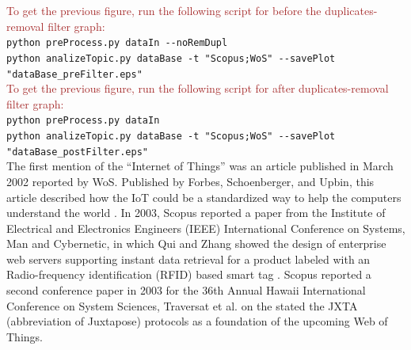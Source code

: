\documentclass[symmetry,article,accept,moreauthors,pdftex10pt,a4paper]{mdpi}
\begin{document}
\noindent
\textcolor{brown}{To get the previous figure, run the following script for before the duplicates-removal filter graph:}\\
\hspace*{0.5cm}\verb|python preProcess.py dataIn --noRemDupl|\\
\hspace*{0.5cm}\verb|python analizeTopic.py dataBase -t "Scopus;WoS" --savePlot "dataBase_preFilter.eps"|\\

\noindent
\textcolor{brown}{To get the previous figure, run the following script for after duplicates-removal filter graph:}\\
\hspace*{0.5cm}\verb|python preProcess.py dataIn|\\
\hspace*{0.5cm}\verb|python analizeTopic.py dataBase -t "Scopus;WoS" --savePlot "dataBase_postFilter.eps"|\\


The first mention of the ``Internet of Things'' was an article published in March 2002 reported by WoS. Published by Forbes, Schoenberger, and Upbin, this article described how the IoT could be a standardized way to help the computers understand the world \cite{ISI:000174207300032}. In 2003, Scopus reported a paper from the Institute of Electrical and Electronics Engineers (IEEE) International Conference on Systems, Man and Cybernetic, in which Qui and Zhang showed the design of enterprise web servers supporting instant data retrieval for a product labeled with an Radio-frequency identification (RFID) based smart tag \cite{Qiu20032661}. Scopus reported a second conference paper in 2003 for the 36th Annual Hawaii International Conference on System Sciences, Traversat et al. on the stated the JXTA (abbreviation of Juxtapose) protocols as a foundation of the upcoming Web of Things\cite{Traversat2003}. 

\end{document}
